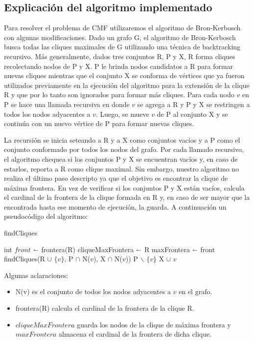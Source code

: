 \subsection{Explicación del algoritmo implementado}

Para resolver el problema de CMF utilizaremos el algoritmo de Bron-Kerbosch con algunas modificaciones. Dado un grafo G, el algoritmo de Bron-Kerbosch busca todas las cliques maximales de G utilizando una técnica de backtracking recursivo. Más generalmente, dados tres conjuntos R, P y X, R forma cliques recolectando nodos de P y X. P le brinda nodos candidatos a R para formar nuevas cliques mientras que el conjunto X se conforma de vértices que ya fueron utilizados previamente en la ejecución del algoritmo para la extensión de la clique R y que por lo tanto son ignorados para formar más cliques. Para cada nodo $v$ en P se hace una llamada recursiva en donde $v$ se agrega a R y P y X se restringen a todos los nodos adyacentes a $v$. Luego, se mueve $v$ de P al conjunto X y se continúa con un nuevo vértice de P para formar nuevas cliques.

La recursión se inicia seteando a R y a X como conjuntos vacíos y a P como el conjunto conformado por todos los nodos del grafo. Por cada llamado recursivo, el algoritmo chequea si los conjuntos P y X se encuentran vacíos y, en caso de estarlos, reporta a R como clique maximal. Sin embargo, nuestro algoritmo no realiza el último paso descripto ya que el objetivo es encontrar la clique de máxima frontera. En vez de verificar si los conjuntos P y X están vacíos, calcula el cardinal de la frontera de la clique formada en R y, en caso de ser mayor que la encontrada hasta ese momento de ejecución, la guarda. A continuación un pseudocódigo del algoritmo:

\begin{algorithm}[H]
\caption{findCliques}\label{ej1}
\begin{algorithmic}[1]
	\State int $front$ $\shortleftarrow$ frontera(R)
		\State cliqueMaxFrontera $\shortleftarrow$ R
		\State maxFrontera $\shortleftarrow$ front
	\EndIf
		\State findCliques(R $\cup$ $\{v\}$, P $\cap$ N($v$), X $\cap$ N($v$))
		\State P $\backslash$ $\{v\}$
		\State X $\cup$ $v$
	\EndFor
\EndProcedure
\end{algorithmic}
\end{algorithm}

Algunas aclaraciones:
\begin{itemize}
	\item N(v) es el conjunto de todos los nodos adyacentes a $v$ en el grafo.
	\item frontera(R) calcula el cardinal de la frontera de la clique R.
	\item $cliqueMaxFrontera$ guarda los nodos de la clique de máxima frontera y $maxFrontera$ almacena el cardinal de la frontera de dicha clique.
\end{itemize}


